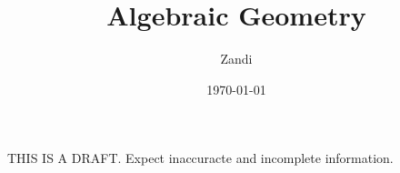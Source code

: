 \documentclass[draft]{article}
\begin{document}
\title{Algebraic Geometry}
\author{Zandi} %
\date{\today}
\maketitle

THIS IS A DRAFT. Expect inaccuracte and incomplete information.

\begin{abstract}

\end{abstract}





\end{document}

